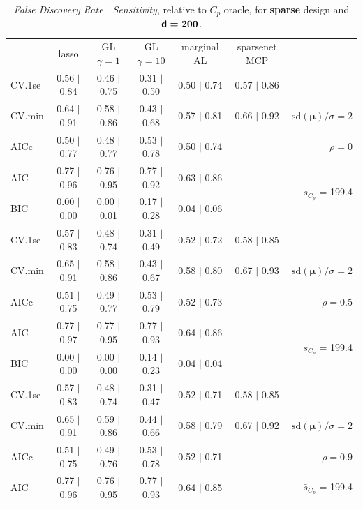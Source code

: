 \documentclass[12pt]{article}
\newcommand{\mr}[1]{\mathrm{#1}}
\newcommand{\bm}[1]{\mathbf{#1}}
\begin{document}
\begin{table}[p]\vspace{-.5cm}
\caption[l]{ {\it False Discovery Rate $\mid$ Sensitivity}, 
relative to $C_p$ oracle, for {\bf sparse} design and $\boldsymbol{{\sf d}=200}$.}
\vspace{-.5cm}
\small{}
\begin{center}
\begin{tabular}{l*{5}{c}|r}
 & lasso & GL $\gamma=1$ & GL $\gamma=10$ & marginal AL & sparsenet MCP  & \\
 \cline{1-7}
CV.1se & 0.56 $\mid$ 0.84 & 0.46 $\mid$ 0.75 & 0.31 $\mid$ 0.50 & 0.50 $\mid$ 0.74 & 0.57 $\mid$ 0.86 &\\
CV.min & 0.64 $\mid$ 0.91 & 0.58 $\mid$ 0.86 & 0.43 $\mid$ 0.68 & 0.57 $\mid$ 0.81 & 0.66 $\mid$ 0.92 &  $\mr{sd}(\bm{\mu})/\sigma=2$ \\
AICc & 0.50 $\mid$ 0.77 & 0.48 $\mid$ 0.77 & 0.53 $\mid$ 0.78 & 0.50 $\mid$ 0.74 & & $\rho=0$ \\
AIC & 0.77 $\mid$ 0.96 & 0.76 $\mid$ 0.95 & 0.77 $\mid$ 0.92 & 0.63 $\mid$ 0.86 & & \multirow{2}{*}{$\bar{s}_{C_p}$ = 199.4} \\
BIC & 0.00 $\mid$ 0.00 & 0.00 $\mid$ 0.01 & 0.17 $\mid$ 0.28 & 0.04 $\mid$ 0.06 & & \\
 \hline 
CV.1se & 0.57 $\mid$ 0.83 & 0.48 $\mid$ 0.74 & 0.31 $\mid$ 0.49 & 0.52 $\mid$ 0.72 & 0.58 $\mid$ 0.85 &\\
CV.min & 0.65 $\mid$ 0.91 & 0.58 $\mid$ 0.86 & 0.43 $\mid$ 0.67 & 0.58 $\mid$ 0.80 & 0.67 $\mid$ 0.93 &  $\mr{sd}(\bm{\mu})/\sigma=2$ \\
AICc & 0.51 $\mid$ 0.75 & 0.49 $\mid$ 0.77 & 0.53 $\mid$ 0.79 & 0.52 $\mid$ 0.73 & & $\rho=0.5$ \\
AIC & 0.77 $\mid$ 0.97 & 0.77 $\mid$ 0.95 & 0.77 $\mid$ 0.93 & 0.64 $\mid$ 0.86 & & \multirow{2}{*}{$\bar{s}_{C_p}$ = 199.4} \\
BIC & 0.00 $\mid$ 0.00 & 0.00 $\mid$ 0.00 & 0.14 $\mid$ 0.23 & 0.04 $\mid$ 0.04 & & \\
 \hline 
CV.1se & 0.57 $\mid$ 0.83 & 0.48 $\mid$ 0.74 & 0.31 $\mid$ 0.47 & 0.52 $\mid$ 0.71 & 0.58 $\mid$ 0.85 &\\
CV.min & 0.65 $\mid$ 0.91 & 0.59 $\mid$ 0.86 & 0.44 $\mid$ 0.66 & 0.58 $\mid$ 0.79 & 0.67 $\mid$ 0.92 &  $\mr{sd}(\bm{\mu})/\sigma=2$ \\
AICc & 0.51 $\mid$ 0.75 & 0.49 $\mid$ 0.76 & 0.53 $\mid$ 0.78 & 0.52 $\mid$ 0.71 & & $\rho=0.9$ \\
AIC & 0.77 $\mid$ 0.96 & 0.76 $\mid$ 0.95 & 0.77 $\mid$ 0.93 & 0.64 $\mid$ 0.85 & & \multirow{2}{*}{$\bar{s}_{C_p}$ = 199.4} \\

\end{tabular}
\end{center}
\end{table}
\end{document}
